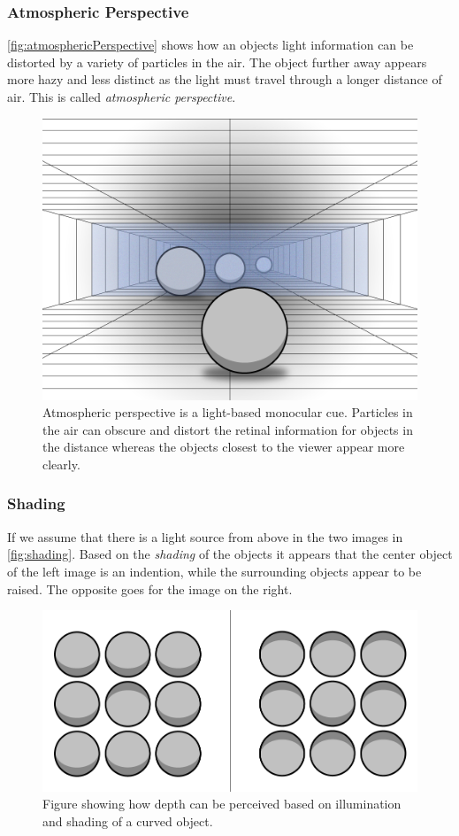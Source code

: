 \subsubsection{Atmospheric Perspective}
\autoref{fig:atmosphericPerspective} shows how an objects light information can be distorted by a variety of particles in the air. The object further away appears more hazy and less distinct as the light must travel through a longer distance of air. This is called \textit{atmospheric perspective}\citep[p.~202]{sensationPerception}.
\begin{figure}[H]
	\centering
	\includegraphics[width=0.8\linewidth]{figure/Analysis/atmosphericPerspective2.png}
	\caption{Atmospheric perspective is a light-based monocular cue. Particles in the air can obscure and distort the retinal information for objects in the distance whereas the objects closest to the viewer appear more clearly.}
	\label{fig:atmosphericPerspective}
\end{figure}

\subsubsection{Shading}
If we assume that there is a light source from above in the two images in \autoref{fig:shading}. Based on the \textit{shading} of the objects it appears that the center object of the left image is an indention, while the surrounding objects appear to be raised. The opposite goes for the image on the right\citep[p.~202]{sensationPerception}.
\begin{figure}[H]
	\centering
	\includegraphics[width=0.8\linewidth]{figure/Analysis/shading.png}
	\caption{Figure showing how depth can be perceived based on illumination and shading of a curved object.}
	\label{fig:shading}
\end{figure}

